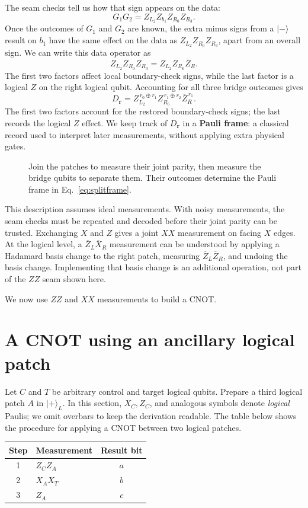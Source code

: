 \documentclass[11pt,a4paper]{article}
\newcommand{\ket}[1]{\lvert #1\rangle}
\newcommand{\XL}{\overline{X}}
\newcommand{\ZL}{\overline{Z}}
\begin{document}
The seam checks tell us how that sign appears on the data:
\[
G_1G_2=Z_{L_2}Z_{b_1}Z_{R_0}Z_{R_3}.
\]
Once the outcomes of $G_1$ and $G_2$ are known, the extra minus signs from a $\ket{-}$ result on $b_1$ have the same effect on the data as $Z_{L_2}Z_{R_0}Z_{R_3}$, apart from an overall sign. We can write this data operator as
\[
Z_{L_2}Z_{R_0}Z_{R_3}
=Z_{L_2}Z_{R_6}\ZL_R.
\]
The first two factors affect local boundary-check signs, while the last factor is a logical $Z$ on the right logical qubit. 
Accounting for all three bridge outcomes gives
\begin{equation}\label{eq:splitframe}
D_{\mathbf r}
=Z_{L_2}^{\,r_0\oplus r_1}
 Z_{R_6}^{\,r_1\oplus r_2}
 \ZL_R^{\,r_1}.
\end{equation}
The first two factors account for the restored boundary-check signs; the last records the logical $Z$ effect. We keep track of $D_{\mathbf r}$ in a \textbf{Pauli frame}: a classical record used to interpret later measurements, without applying extra physical gates.

\begin{figure}[!ht]
\centering\surgerydiagram
\caption{Join the patches to measure their joint parity, then measure the bridge qubits to separate them. Their outcomes determine the Pauli frame in Eq.~\eqref{eq:splitframe}.}
\end{figure}

This description assumes ideal measurements. With noisy measurements, the seam checks must be repeated and decoded before their joint parity can be trusted. Exchanging $X$ and $Z$ gives a joint $XX$ measurement on facing $X$ edges. At the logical level, a $\ZL_L\XL_R$ measurement can be understood by applying a Hadamard basis change to the right patch, measuring $\ZL_L\ZL_R$, and undoing the basis change. Implementing that basis change is an additional operation, not part of the $ZZ$ seam shown here.

We now use $ZZ$ and $XX$ measurements to build a CNOT.

\section{A CNOT using an ancillary logical patch}
Let $C$ and $T$ be arbitrary control and target logical qubits. Prepare a third logical patch $A$ in $\ket{+}_L$. In this section, $X_C,Z_C$, and analogous symbols denote \emph{logical} Paulis; we omit overbars to keep the derivation readable.
The table below shows the procedure for applying a CNOT between two logical patches.
\begin{center}
\begin{tabular}{clc}
\toprule
Step & Measurement & Result bit\\
\midrule
1 & $Z_CZ_A$ & $a$\\
2 & $X_AX_T$ & $b$\\
3 & $Z_A$    & $c$\\
\bottomrule
\end{tabular}
\end{center}
\end{document}
